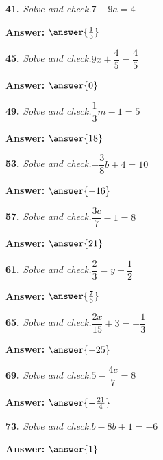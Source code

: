 \documentclass{ximera}
\begin{document}
\begin{problem}
\textbf{41.} \emph{Solve and check.}\quad $7 - 9a = 4$

\textbf{Answer:} $\answer{\frac{1}{3}}$
\end{problem}

\begin{problem}
\textbf{45.} \emph{Solve and check.}\quad $9x + \dfrac{4}{5} = \dfrac{4}{5}$

\textbf{Answer:} $\answer{0}$
\end{problem}

\begin{problem}
\textbf{49.} \emph{Solve and check.}\quad $\dfrac{1}{3}m - 1 = 5$

\textbf{Answer:} $\answer{18}$
\end{problem}

\begin{problem}
\textbf{53.} \emph{Solve and check.}\quad $-\dfrac{3}{8}b + 4 = 10$

\textbf{Answer:} $\answer{-16}$
\end{problem}

\begin{problem}
\textbf{57.} \emph{Solve and check.}\quad $\dfrac{3c}{7} - 1 = 8$

\textbf{Answer:} $\answer{21}$
\end{problem}

\begin{problem}
\textbf{61.} \emph{Solve and check.}\quad $\dfrac{2}{3} = y - \dfrac{1}{2}$

\textbf{Answer:} $\answer{\frac{7}{6}}$
\end{problem}

\begin{problem}
\textbf{65.} \emph{Solve and check.}\quad $\dfrac{2x}{15} + 3 = -\dfrac{1}{3}$

\textbf{Answer:} $\answer{-25}$
\end{problem}

\begin{problem}
\textbf{69.} \emph{Solve and check.}\quad $5 - \dfrac{4c}{7} = 8$

\textbf{Answer:} $\answer{-\frac{21}{4}}$
\end{problem}

\begin{problem}
\textbf{73.} \emph{Solve and check.}\quad $b - 8b + 1 = -6$

\textbf{Answer:} $\answer{1}$
\end{problem}
\end{document}
